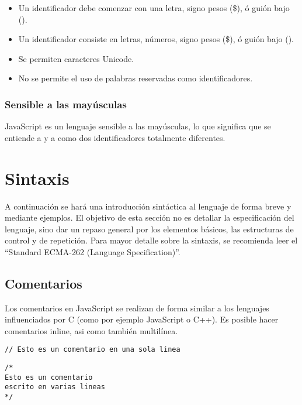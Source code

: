 \begin{itemize}
\item Un identificador debe comenzar con una letra, signo pesos (\$), ó guión bajo (\textunderscore).
\item Un identificador consiste en letras, números, signo pesos (\$), ó guión bajo (\textunderscore).
\item Se permiten caracteres Unicode.
\item No se permite el uso de palabras reservadas como identificadores.
\end{itemize}

\subsubsection{Sensible a las mayúsculas}

JavaScript es un lenguaje sensible a las mayúsculas, lo que significa que se entiende a  y a  como dos identificadores totalmente diferentes.


\section{Sintaxis}

A continuación se hará una introducción sintáctica al lenguaje de forma breve y mediante ejemplos. El objetivo de esta sección no es detallar la especificación del lenguaje, sino dar un repaso general por los elementos básicos, las estructuras de control y de repetición. Para mayor detalle sobre la sintaxis, se recomienda leer el "`Standard ECMA-262 (Language Specification)"'.

\subsection{Comentarios}

Los comentarios en JavaScript se realizan de forma similar a los lenguajes influenciados por C (como por ejemplo JavaScript o C++). Es posible hacer comentarios inline, asi como también multilínea.

\begin{lstlisting}[title={Comentario inline}]
// Esto es un comentario en una sola linea
\end{lstlisting}

\begin{lstlisting}[title={Comentario multilinea}]
/* 
Esto es un comentario
escrito en varias lineas
*/
\end{lstlisting}

